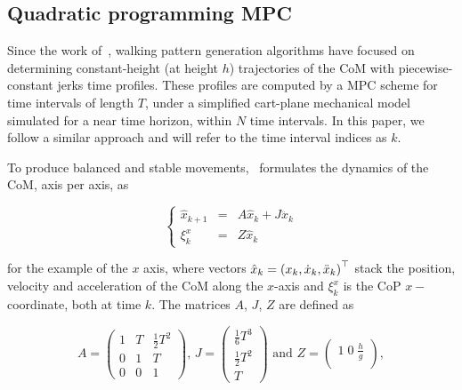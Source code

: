 \subsection{Quadratic programming MPC}

\label{sec:wpg}

Since the work of~\cite{Kajita2003}, walking pattern generation algorithms have focused on determining constant-height (at height $h$) trajectories of the CoM with piecewise-constant jerks time profiles. These profiles are computed by a MPC scheme for time intervals of length $T$, under a simplified cart-plane mechanical model simulated for a near time horizon,  within $N$ time intervals. In this paper, we follow a similar approach and will refer to the time interval indices as $k$. 

To produce balanced and stable movements,~\cite{Kajita2003} formulates the dynamics of the CoM, axis per axis, as   

\begin{equation}
\left\{
\begin{array}{ccc}
 \hat{x}_{k+1} &=& A \hat{x}_k + J \dddot{x}_k\\
 \xi^x_{k} &=& Z \hat{x}_k 
\end{array}
\right.
\label{Eq:dynamic}
\end{equation}

for the example of the $x$ axis, where vectors $\hat{x}_{k} = \left( x_k, \dot{x}_k, \ddot{x}_k \right)^{\top}$ stack the position, velocity and acceleration of the CoM along the $x$-axis and ${\xi}^x_k$ is the CoP $x-$coordinate, both at time $k$. The matrices $A$, $J$, $Z$ are defined as

\begin{equation*}
A = \left(
\begin{matrix}
1 & T & \frac{1}{2}T^2 \\
0 & 1 & T \\
0 & 0 & 1
\end{matrix}
\right) \text{, }
J = \left(
\begin{matrix}
\frac{1}{6}T^3 \\
\frac{1}{2}T^2 \\
T
\end{matrix}
\right) \text{ and }
Z = \left(
\begin{matrix}
1 \; 0 \; \frac{h}{g} \\
\end{matrix}
\right),
\end{equation*}

